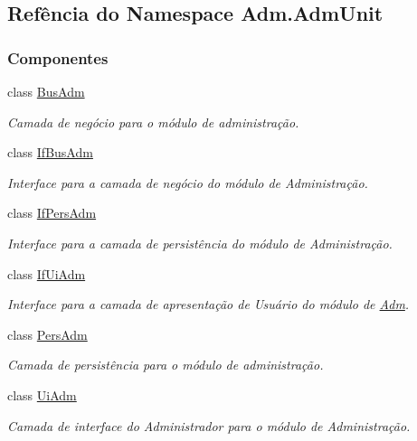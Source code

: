 \hypertarget{namespaceAdm_1_1AdmUnit}{}\subsection{Refência do Namespace Adm.\+Adm\+Unit}
\label{namespaceAdm_1_1AdmUnit}
\subsubsection*{Componentes}
\begin{DoxyCompactItemize}
\item 
class \hyperlink{classAdm_1_1AdmUnit_1_1BusAdm}{Bus\+Adm}
\begin{DoxyCompactList}\small\item\em Camada de negócio para o módulo de administração. \end{DoxyCompactList}\item 
class \hyperlink{classAdm_1_1AdmUnit_1_1IfBusAdm}{If\+Bus\+Adm}
\begin{DoxyCompactList}\small\item\em Interface para a camada de negócio do módulo de Administração. \end{DoxyCompactList}\item 
class \hyperlink{classAdm_1_1AdmUnit_1_1IfPersAdm}{If\+Pers\+Adm}
\begin{DoxyCompactList}\small\item\em Interface para a camada de persistência do módulo de Administração. \end{DoxyCompactList}\item 
class \hyperlink{classAdm_1_1AdmUnit_1_1IfUiAdm}{If\+Ui\+Adm}
\begin{DoxyCompactList}\small\item\em Interface para a camada de apresentação de Usuário do módulo de \hyperlink{namespaceAdm}{Adm}. \end{DoxyCompactList}\item 
class \hyperlink{classAdm_1_1AdmUnit_1_1PersAdm}{Pers\+Adm}
\begin{DoxyCompactList}\small\item\em Camada de persistência para o módulo de administração. \end{DoxyCompactList}\item 
class \hyperlink{classAdm_1_1AdmUnit_1_1UiAdm}{Ui\+Adm}
\begin{DoxyCompactList}\small\item\em Camada de interface do Administrador para o módulo de Administração. \end{DoxyCompactList}\end{DoxyCompactItemize}
